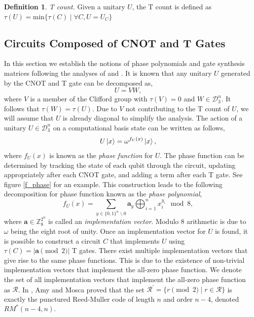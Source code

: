 \documentclass{article}
\theoremstyle{definition}
\newtheorem{definition}{Definition}[section]
\theoremstyle{problem}
\theoremstyle{lemma}
\begin{document}
	\theoremstyle{definition}
	\begin{definition}{\emph{T count.}}
		Given a unitary $U$, the T count is defined as $\tau(U) = \text{min}\{\tau(C) \mid \forall C, U = U_C\}$
	\end{definition}
	
	\FloatBarrier
		\subsection{Circuits Composed of CNOT and T Gates}
	In this section we establish the notions of phase polynomials and gate synthesis matrices following the analyses of \cite{8_Amy_2016} and \cite{1_Campbell_2017}.
	It is known that any unitary $U$ generated by the CNOT and T gate can be decomposed as,
	\begin{equation}
	U = VW,
	\end{equation}
	where $V$ is a member of the Clifford group with $\tau(V)=0$ and $W \in \mathcal{D}_3^n$. It follows that $\tau(W) = \tau(U)$. Due to $V$ not contributing to the T count of $U$, we will assume that $U$ is already diagonal to simplify the analysis.	
	The action of a unitary $U \in \mathcal{D}_3^n$ on a computational basis state can be written as follows,
	\begin{equation}
	U\left\vert{x}\right\rangle = \omega^{f_U(x)}\left\vert{x}\right\rangle,
	\end{equation}
	where $f_U(x)$ is known as the \emph{phase function} for $U$. The phase function can be determined by tracking the state of each qubit through the circuit, updating appropriately after each CNOT gate, and adding a term after each T gate. See figure \ref{f_phase} for an example. This construction leads to the following decomposition for phase function known as the \emph{phase polynomial},
	\begin{equation}
	f_U(x) = \sum_{y\in\{0,1\}^n\backslash 0} \mathbf{a}_y \bigoplus_{i=1}^n x_i^{y_i}\mod 8,
	\end{equation}
	where $\mathbf{a}\in \mathbb{Z}_8^{2^n}$ is called an \emph{implementation vector}. Modulo 8 arithmetic is due to $\omega$ being the eight root of unity. Once an implementation vector for $U$ is found, it is possible to construct a circuit $C$ that implements $U$ using $\tau(C) = |\mathbf{a} \pmod{2}|$ T gates. There exist multiple implementation vectors that give rise to the same phase functions. This is due to the existence of non-trivial implementation vectors that implement the all-zero phase function. We denote the set of all implementation vectors that implement the all-zero phase function as $\mathcal{R}$. In \cite{8_Amy_2016}, Amy and Mosca proved that the set $\mathcal{R}^\prime = \{r \pmod{2} \mid r \in \mathcal{R}\}$ is exactly the punctured Reed-Muller code of length $n$ and order $n-4$, denoted $RM^*(n-4,n)$.
	
\end{document}
